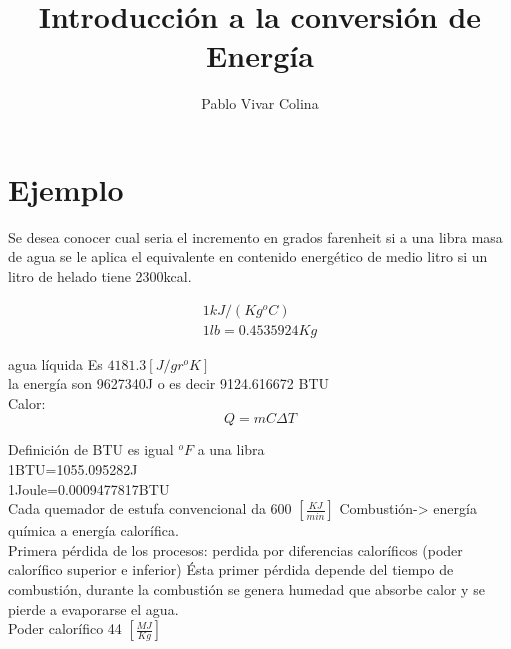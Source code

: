 \documentclass[]{article}
\title{Introducción a la conversión de Energía}
\author{Pablo Vivar Colina}
\begin{document}
	

\maketitle



\section{Ejemplo}

Se desea conocer cual seria el incremento en grados farenheit si a una libra masa de agua se le aplica el equivalente en contenido 
energético de medio litro si un litro de helado tiene 2300kcal.

\begin{eqnarray}
  1kJ/(Kg^oC)\\
  1lb=0.4535924Kg
\end{eqnarray}

agua líquida Es $4181.3[J/gr^oK]$\\

la energía son 9627340J o es decir 9124.616672 BTU\\

Calor:\\ 

\begin{equation}
  Q=mC \Delta T
\end{equation}

Definición de BTU es igual $^oF$ a una libra\\

1BTU=1055.095282J\\

1Joule=0.0009477817BTU\\


Cada quemador de estufa convencional da 600 $[\frac{KJ}{min}]$
Combustión-> energía química a energía calorífica.\\

Primera pérdida de los procesos: perdida por diferencias caloríficos (poder calorífico superior e inferior) Ésta primer pérdida depende del tiempo de combustión, durante la combustión se genera humedad que absorbe calor y se pierde a evaporarse el agua.\\

Poder calorífico 44 $[\frac{MJ}{Kg}]$
\end{document}
